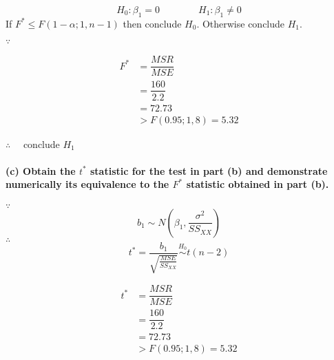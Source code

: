 \documentclass[]{article}
\newenvironment{Shaded}{\begin{snugshade}}{\end{snugshade}}
\newcommand{\KeywordTok}[1]{\textcolor[rgb]{0.13,0.29,0.53}{\textbf{#1}}}
\newcommand{\DecValTok}[1]{\textcolor[rgb]{0.00,0.00,0.81}{#1}}
\newcommand{\StringTok}[1]{\textcolor[rgb]{0.31,0.60,0.02}{#1}}
\newcommand{\OperatorTok}[1]{\textcolor[rgb]{0.81,0.36,0.00}{\textbf{#1}}}
\newcommand{\NormalTok}[1]{#1}
\let\oldparagraph\paragraph
\renewcommand{\paragraph}[1]{\oldparagraph{#1}\mbox{}}
\begin{document}
\[H_0:\beta_1=0\qquad\qquad H_1:\beta_1\neq 0\] If
\(F^*\leqslant F(1-\alpha;1,n-1)\) then conclude \(H_0\). Otherwise
conclude \(H_1\).

\(\because\quad\)

\begin{align*}
F^*&=\dfrac{MSR}{MSE}\\
&=\dfrac{160}{2.2}\\
&=72.73\\
&>F(0.95;1,8)=5.32
\end{align*}

\(\therefore\quad\) conclude \(H_1\)

\paragraph{\texorpdfstring{(c) Obtain the \(t^*\) statistic for the test
in part (b) and demonstrate numerically its equivalence to the \(F^*\)
statistic obtained in part
(b).}{(c) Obtain the t\^{}* statistic for the test in part (b) and demonstrate numerically its equivalence to the F\^{}* statistic obtained in part (b).}}\label{c-obtain-the-t-statistic-for-the-test-in-part-b-and-demonstrate-numerically-its-equivalence-to-the-f-statistic-obtained-in-part-b.}

\(\because\quad\) \[b_1\sim N(\beta_1,\frac{\sigma^2}{SS_{XX}})\]
\(\therefore\quad\)
\[t^*=\dfrac{b_1}{\sqrt{\frac{MSE}{SS_{XX}}}}\overset{H_0}{\sim} t(n-2)\]

\begin{align*}
t^*&=\dfrac{MSR}{MSE}\\
&=\dfrac{160}{2.2}\\
&=72.73\\
&>F(0.95;1,8)=5.32
\end{align*}

\begin{Shaded}
\end{Shaded}
\end{document}
